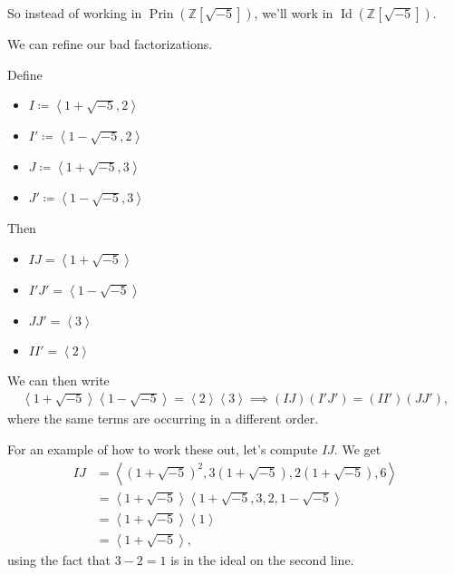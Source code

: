 So instead of working in
\(\operatorname{Prin}( {\mathbb{Z}}[\sqrt{-5} ])\), we'll work in
\(\operatorname{Id}({\mathbb{Z}}[\sqrt{-5} ])\).

\begin{claim}

We can refine our bad factorizations.

\end{claim}

Define

\begin{itemize}
\tightlist
\item
  \(I\coloneqq\left\langle{ 1 + \sqrt{-5} , 2 }\right\rangle\)
\item
  \(I'\coloneqq\left\langle{ 1 - \sqrt{-5} , 2 }\right\rangle\)
\item
  \(J\coloneqq\left\langle{ 1 + \sqrt{-5} , 3 }\right\rangle\)
\item
  \(J'\coloneqq\left\langle{ 1 - \sqrt{-5} , 3 }\right\rangle\)
\end{itemize}

Then

\begin{itemize}
\tightlist
\item
  \(IJ = \left\langle{ 1 + \sqrt{-5} }\right\rangle\)\\
\item
  \(I'J' = \left\langle{ 1 - \sqrt{-5} }\right\rangle\)\\
\item
  \(JJ' = \left\langle{ 3 }\right\rangle\)
\item
  \(II' = \left\langle{ 2 }\right\rangle\)
\end{itemize}

We can then write
\begin{align*}
\left\langle{ 1 + \sqrt{-5} }\right\rangle \left\langle{ 1 - \sqrt{-5} }\right\rangle = \left\langle{ 2 }\right\rangle \left\langle{ 3 }\right\rangle \implies (IJ)(I'J') = (II')(JJ')    
,\end{align*}
where the same terms are occurring in a different order.

For an example of how to work these out, let's compute \(IJ\). We get
\begin{align*}
IJ 
&= \left\langle{ (1 + \sqrt{-5} )^2, 3(1 + \sqrt{-5} ), 2(1 + \sqrt{-5} ), 6 }\right\rangle  \\
&= \left\langle{ 1 + \sqrt{-5} }\right\rangle \left\langle{ 1 + \sqrt{-5} , 3, 2, 1 - \sqrt{-5} }\right\rangle \\  
&= \left\langle{ 1 + \sqrt{-5} }\right\rangle \left\langle{ 1 }\right\rangle  \\
&= \left\langle{ 1 + \sqrt{-5} }\right\rangle
,\end{align*}
using the fact that \(3-2=1\) is in the ideal on the second line.


